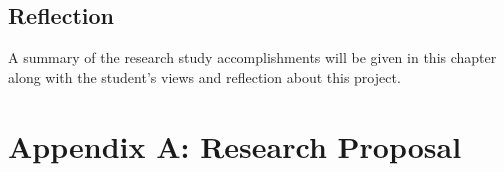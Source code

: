 \documentclass[11pt]{article}
\begin{document}
    	\subsection{Reflection}
		A summary of the research study accomplishments will be given in this chapter along with the student's views and reflection about this project.

    \newpage
    
    
    \thispagestyle{plain}
    \clearpage

    \section*{Appendix A: Research Proposal}
    
\end{document}
